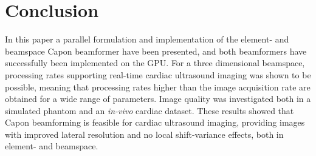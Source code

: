 \documentclass[journal]{IEEEtran}
\begin{document}
\section{Conclusion}\label{sec:con}
In this paper a parallel formulation and implementation of the element- and beamspace Capon beamformer have been presented, and
both beamformers have successfully been implemented on the GPU. For a three dimensional beamspace, processing rates supporting real-time cardiac ultrasound imaging was shown to be possible, meaning that processing rates higher than the image acquisition rate are obtained for a wide range of parameters. Image quality was investigated both in a simulated phantom and an \textit{in-vivo} cardiac dataset. These results showed that Capon beamforming is feasible for cardiac ultrasound imaging, providing images with improved lateral resolution and no local shift-variance effects, both in element- and beamspace.




%
%
\end{document}
